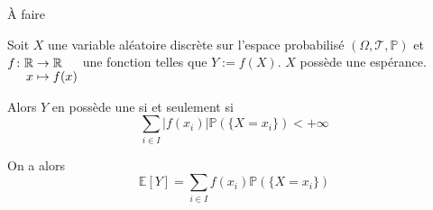 \documentclass[a4paper, 12pt]{article}
\begin{document}
\begin{demonstration}









    \begin{hotwarn}
        À faire
    \end{hotwarn}
\end{demonstration}

\begin{definition}
    Soit $X$ une variable aléatoire discrète sur l'espace probabilisé $(\Omega, \mathcal{T}, \mathbb{P})$ et $\funcdef{f}{\R}{\R}{x}{f(x)}$ une fonction telles que $Y:= f(X)$.
    $X$ possède une espérance.
    
    Alors $Y$ en possède une si et seulement si
    $$
    \sum_{i \in I} |f(x_i)| \mathbb{P}(\{ X = x_i \}) < +\infty
    $$
    
    On a alors
    $$
    \mathbb{E}[Y] = \sum_{i \in I} f(x_i) \mathbb{P}(\{ X = x_i \})
    $$
\end{definition}
\end{document}
